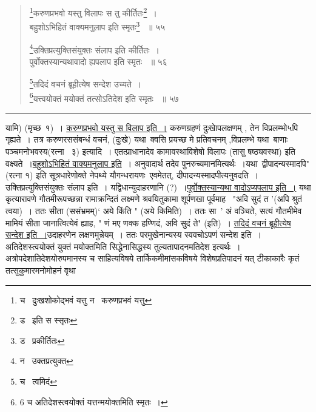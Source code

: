 \documentclass[11pt, openany]{book}
\begin{document}
{\begin{quote}
 {\na \renewcommand{\thefootnote}{1}\footnote{च \textendash\ दुःखशोकोद्भवं यत्तु न \textendash\ करुणप्रभवं यत्तु}करुणप्रभवो यस्तु विलापः स तु कीर्तितः\renewcommand{\thefootnote}{2}\footnote{ड \textendash\ इति स स्सृतः }~। \\
बहुशोऽभिहितं वाक्यमनुलाप इति स्मृतः\renewcommand{\thefootnote}{3}\footnote{ड \textendash\ प्रकीर्तितः} ~॥ ५५ 

\renewcommand{\thefootnote}{4}\footnote{न \textendash\ उक्तप्रत्युक्त}उक्तिप्रत्युक्तिसंयुक्तः संलाप इति कीर्तितः~।\\ 
पुर्वोक्तस्यान्यथावादो ह्यपलाप इति स्मृतः ~॥ ५६ 

\renewcommand{\thefootnote}{5}\footnote{च \textendash\ त्वमिदं}तदिदं वचनं ब्रूहीत्येष सन्देश उच्यते~।\\ 
\renewcommand{\thefootnote}{6}\footnote{6 च अतिदेशस्त्वयोक्तं यत्तन्मयोक्तमिति स्मृतः~। }यत्त्वयोक्तं मयोक्तं तत्सोऽतिदेश इति स्मृतः ~॥ ५७ }
\end{quote}

\hrule

\vspace{2mm}

\begin{sloppypar}
\noindent
यामि) (मृच्छ\textendash\ १)~। \underline{करुणप्रभवो यस्तु स विलाप इति~।} करुणग्रहणं दुःखाेपलक्षणम् , तेन विप्रलम्भो५पि गृह्यते~। तत्र करुणरससंबन्धं वचनं, (दुःखे) यथा\textendash\ क्वसि प्रयच्छ मे प्रतिवचनम् ,विप्रलम्भे यथा\textendash\ बाणाः पञ्चमनोभवस्य(रत्ना \textendash\ ३) इत्यादि~। एतत्प्राधानादेव कामावस्थाविशेषो विलापः (तासु षष्ठ्यवस्था) इति वक्ष्यते~।\underline{बहुशोऽभिहितं वाक्यमनुलाप इति}~। अनुवादार्थ तदेव पुनरुच्यमानमित्यर्थः~।यथा\textendash\ द्वीपादन्यस्मादपि" (रत्ना १) इति सूत्रधारेणोक्ते नेपथ्ये यौगन्धरायणः\textendash\ एवमेतत्, दीपादन्यस्मादपीत्यनुवदति~। उक्तिप्रत्युक्तिसंयुक्तः संलाप इति~। यद्विधान्युदाहरणानि (?)~।\underline{पूर्वोक्तस्यान्यथा वादोऽप्यपलाप इति~।} यथा कृत्यारावणे गौतमीरूपच्छन्ना रामाक्रन्दितं लक्ष्मणे श्रवयितुकामा शूर्पणखा पूर्वमाह \textendash\ "अवि सुदं त '(अपि श्रुतं त्वया)~। ततः सीता (ससंभ्रमम्)` अये किंति " (अये किमिति)~। ततः सा\textendash\ ' अं वञ्चिते, सत्यं गौतमीमेव मामियं सीता जानात्वित्येवं ह्याह, " णं मए णक्क हण्णिदं, अवि सुदं ते" (इति)~। \underline{तदिदं वचनं ब्रूहीत्येष सन्देश इति~।}उदाहरणेन लक्षणमुन्नेयम्~। ततः परमुखेनान्यस्य स्ववचोऽपणं सन्देश इति~। अतिदेशस्त्वयोक्तं युक्तं मयोक्तमिति सिद्धेनासिद्धस्य तुल्यतापादनमतिदेश इत्यर्थः~। अत्रोपदेशातिदेशयोरुपमानस्य च साहित्यविषये तार्किकमीमांसकविषये विशेषप्रतिपादनं यत् टीकाकारैः कृतं तत्सुकुमारमनोमोहनं वृथा 
\end{sloppypar}

}
\end{document}
